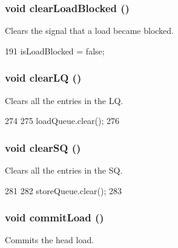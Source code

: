 \hypertarget{classLSQUnit_aaa9628e569d007b553e6830774b8548c}{
\subsubsection[{clearLoadBlocked}]{\setlength{\rightskip}{0pt plus 5cm}void clearLoadBlocked ()}}
\label{classLSQUnit_aaa9628e569d007b553e6830774b8548c}
Clears the signal that a load became blocked. 


\begin{DoxyCode}
191     { isLoadBlocked = false; }
\end{DoxyCode}
\hypertarget{classLSQUnit_ae3af532345dbe6519e8272d9cd677230}{
\subsubsection[{clearLQ}]{\setlength{\rightskip}{0pt plus 5cm}void clearLQ ()}}
\label{classLSQUnit_ae3af532345dbe6519e8272d9cd677230}
Clears all the entries in the LQ. 


\begin{DoxyCode}
274 {
275     loadQueue.clear();
276 }
\end{DoxyCode}
\hypertarget{classLSQUnit_a171cd7891063f418b1ee217f5c03537b}{
\subsubsection[{clearSQ}]{\setlength{\rightskip}{0pt plus 5cm}void clearSQ ()}}
\label{classLSQUnit_a171cd7891063f418b1ee217f5c03537b}
Clears all the entries in the SQ. 


\begin{DoxyCode}
281 {
282     storeQueue.clear();
283 }
\end{DoxyCode}
\hypertarget{classLSQUnit_a8ddd26e169a62ec5ae591a9f95934839}{
\subsubsection[{commitLoad}]{\setlength{\rightskip}{0pt plus 5cm}void commitLoad ()}}
\label{classLSQUnit_a8ddd26e169a62ec5ae591a9f95934839}
Commits the head load. 


